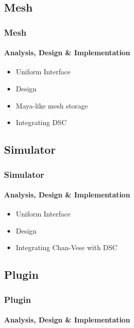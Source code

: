 \documentclass[12pt,t]{beamer}
\newcommand{\graphicc}[4]{\begin{figure}[H] \centering
            \texttt{[image: \{\#2]}}
\begin{document}
\subsection{Mesh}
\begin{frame}
    \frametitle{Mesh}
    \framesubtitle{Analysis, Design \& Implementation}
    \vspace*{\fill}
    \begin{itemize}
      \item Uniform Interface
      \item Design
      \item Maya-like mesh storage
      \item Integrating DSC
    \end{itemize}
    \vspace*{\fill}
\end{frame}

\subsection{Simulator}
\begin{frame}
    \frametitle{Simulator}
    \framesubtitle{Analysis, Design \& Implementation}
    \vspace*{\fill}
    \begin{itemize}
      \item Uniform Interface
      \item Design
      \item Integrating Chan-Vese with DSC
    \end{itemize}
    \vspace*{\fill}
\end{frame}

\subsection{Plugin}
\begin{frame}
    \frametitle{Plugin}
    \framesubtitle{Analysis, Design \& Implementation}

    \begin{columns}
    \end{columns}
\end{frame}
\end{document}
